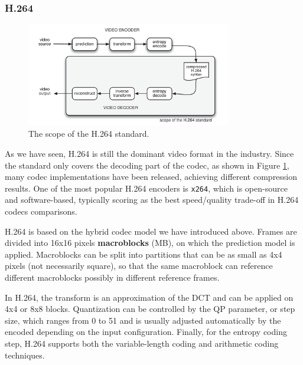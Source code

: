 
\subsubsection{H.264}
\label{sec:bg/compression/codecs/h264}

\begin{figure}
	\centering
	
	\includegraphics[width=0.8\textwidth]{res/h264_scope.png}
	
	\caption{The scope of the H.264 standard.}
	\label{fig:h264_scope}
\end{figure}

As we have seen, H.264 is still the dominant video format in the industry. Since the standard only covers the decoding part of the codec, as shown in Figure \ref{fig:h264_scope}, many codec implementations have been released, achieving different compression results. One of the most popular H.264 encoders is \texttt{x264}, which is open-source and software-based, typically scoring as the best speed/quality trade-off in H.264 codecs comparisons.\cite{msu2021}

H.264 is based on the hybrid codec model we have introduced above. Frames are divided into 16x16 pixels \textbf{macroblocks} (MB), on which the prediction model is applied. Macroblocks can be split into partitions that can be as small as 4x4 pixels (not necessarily square), so that the same macroblock can reference different macroblocks possibly in different reference frames.

In H.264, the transform is an approximation of the DCT and can be applied on 4x4 or 8x8 blocks. Quantization can be controlled by the QP parameter, or step size, which ranges from 0 to 51 and is usually adjusted automatically by the encoded depending on the input configuration. Finally, for the entropy coding step, H.264 supports both the variable-length coding and arithmetic coding techniques.

